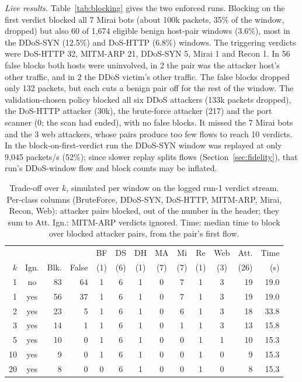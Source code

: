 \emph{Live results.} Table~\ref{tab:blocking} gives the two enforced runs. Blocking on the first verdict blocked all 7 Mirai bots (about 100k packets, 35\% of the window, dropped) but also 60 of 1,674 eligible benign host-pair windows (3.6\%), most in the DDoS-SYN (12.5\%) and DoS-HTTP (6.8\%) windows. The triggering verdicts were DoS-HTTP 32, MITM-ARP 21, DDoS-SYN 5, Mirai 1 and Recon 1. In 56 false blocks both hosts were uninvolved, in 2 the pair was the attacker host's other traffic, and in 2 the DDoS victim's other traffic. The false blocks dropped only 132 packets, but each cuts a benign pair off for the rest of the window. The validation-chosen policy blocked all six DDoS attackers (133k packets dropped), the DoS-HTTP attacker (30k), the brute-force attacker (217) and the port scanner (0; the scan had ended), with no false blocks. It missed the 7 Mirai bots and the 3 web attackers, whose pairs produce too few flows to reach 10 verdicts. In the block-on-first-verdict run the DDoS-SYN window was replayed at only 9,045 packets/s (52\%); since slower replay splits flows (Section~\ref{sec:fidelity}), that run's DDoS-window flow and block counts may be inflated.

\begin{table}[t]
\centering
\caption{Trade-off over $k$, simulated per window on the logged run-1 verdict stream. Per-class columns (BruteForce, DDoS-SYN, DoS-HTTP, MITM-ARP, Mirai, Recon, Web): attacker pairs blocked, out of the number in the header; they sum to Att. Ign.: MITM-ARP verdicts ignored. Time: median time to block over blocked attacker pairs, from the pair's first flow.}
\label{tab:kcurve}
\footnotesize
\setlength{\tabcolsep}{2.4pt}
\begin{tabular}{rcrrcccccccrr}
\hline
 & & & & BF & DS & DH & MA & Mi & Re & Web & Att. & Time \\
$k$ & Ign. & Blk. & False & (1) & (6) & (1) & (7) & (7) & (1) & (3) & (26) & (s) \\
\hline
1  & no  & 83 & 64 & 1 & 6 & 1 & 0 & 7 & 1 & 3 & 19 & 19.0 \\
1  & yes & 56 & 37 & 1 & 6 & 1 & 0 & 7 & 1 & 3 & 19 & 19.0 \\
2  & yes & 23 &  5 & 1 & 6 & 1 & 0 & 6 & 1 & 3 & 18 & 33.8 \\
3  & yes & 14 &  1 & 1 & 6 & 1 & 0 & 1 & 1 & 3 & 13 & 15.8 \\
5  & yes & 10 &  0 & 1 & 6 & 1 & 0 & 0 & 1 & 1 & 10 & 15.3 \\
10 & yes &  9 &  0 & 1 & 6 & 1 & 0 & 0 & 1 & 0 &  9 & 15.3 \\
20 & yes &  8 &  0 & 0 & 6 & 1 & 0 & 0 & 1 & 0 &  8 & 15.3 \\
\hline
\end{tabular}
\end{table}

